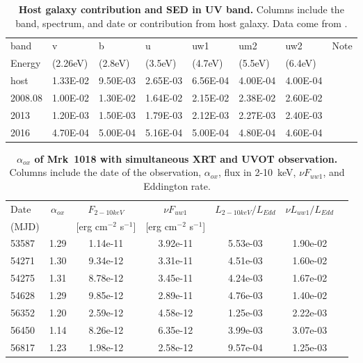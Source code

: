 \begin{table}
\centering
\caption{{\bf Host galaxy contribution and SED in UV band.} Columns include the band, spectrum, and date or contribution from host galaxy. Data come from \citet{2018MNRAS.480.3898N}.}
\label{tab:host_contribution}
\begin{tabular}{llllllll}
\hline
\hline
band & v & b & u & uw1 & um2 & uw2 & Note \\ 
Energy     & (2.26eV) & (2.8eV) & (3.5eV) & (4.7eV) & (5.5eV) & (6.4eV) \\ \hline
host & 1.33E-02 & 9.50E-03 & 2.65E-03 & 6.56E-04 & 4.00E-04 & 4.00E-04 &  \\ 
2008.08 & 1.00E-02 & 1.30E-02 & 1.64E-02 & 2.15E-02 & 2.38E-02 & 2.60E-02 &  \\ 
2013 & 1.20E-03 & 1.50E-03 & 1.79E-03 & 2.12E-03 & 2.27E-03 & 2.40E-03 &  \\ 
2016 & 4.70E-04 & 5.00E-04 & 5.16E-04 & 5.00E-04 & 4.80E-04 & 4.60E-04 &  \\  \hline
\end{tabular}   
\end{table}




\begin{table}
\centering
\caption{{\bf $\alpha_{ox}$ of Mrk~1018 with simultaneous XRT and UVOT observation.} Columns include the date of the observation, $\alpha_{ox}$, flux in 2-10~keV, $\nu F_{uw1}$, and Eddington rate.}
\label{tab:tablealpha_ox}
\begin{tabular}{lcccccc}
\hline
\hline
 
 Date &   $\alpha_{ox}$  & $F_{2-10keV}$  &$\nu F_{uw1}$  & $L_{2-10keV}/L_{Edd}$ &   $\nu L_{uw1}/L_{Edd}$  \\ 
 (MJD)&                   &   [erg cm$^{-2}$ s$^{-1}$]   &[erg cm$^{-2}$ s$^{-1}$]    &                    &            
 \\ \hline
53587 & 1.29 & 1.14e-11 & 3.92e-11 & 5.53e-03 & 1.90e-02 \\ 
54271 & 1.30 & 9.34e-12 & 3.31e-11 & 4.51e-03 & 1.60e-02 \\ 
54275 & 1.31 & 8.78e-12 & 3.45e-11 & 4.24e-03 & 1.67e-02 \\ 
54628 & 1.29 & 9.85e-12 & 2.89e-11 & 4.76e-03 & 1.40e-02 \\ 
56352 & 1.20 & 2.59e-12 & 4.58e-12 & 1.25e-03 & 2.22e-03 \\ 
56450 & 1.14 & 8.26e-12 & 6.35e-12 & 3.99e-03 & 3.07e-03 \\ 
56817 & 1.23 & 1.98e-12 & 2.58e-12 & 9.57e-04 & 1.25e-03 \\ \hline
\end{tabular}   
\end{table}